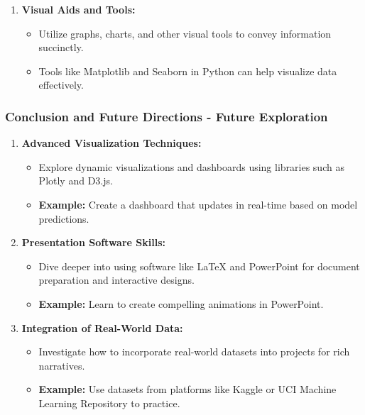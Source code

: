 \documentclass[aspectratio=169]{beamer}
\begin{document}
\begin{frame}[fragile]
\begin{enumerate}
        \item \textbf{Visual Aids and Tools:}
        \begin{itemize}
            \item Utilize graphs, charts, and other visual tools to convey information succinctly.
            \item Tools like Matplotlib and Seaborn in Python can help visualize data effectively.
        \end{itemize}
    \end{enumerate}  

\end{frame}

\begin{frame}[fragile]
    \frametitle{Conclusion and Future Directions - Future Exploration}
    
    \begin{enumerate}
        \item \textbf{Advanced Visualization Techniques:}
        \begin{itemize}
            \item Explore dynamic visualizations and dashboards using libraries such as Plotly and D3.js.
            \item \textbf{Example:} Create a dashboard that updates in real-time based on model predictions.
        \end{itemize}
        
        \item \textbf{Presentation Software Skills:}
        \begin{itemize}
            \item Dive deeper into using software like LaTeX and PowerPoint for document preparation and interactive designs.
            \item \textbf{Example:} Learn to create compelling animations in PowerPoint.
        \end{itemize}
        
        \item \textbf{Integration of Real-World Data:}
        \begin{itemize}
            \item Investigate how to incorporate real-world datasets into projects for rich narratives.
            \item \textbf{Example:} Use datasets from platforms like Kaggle or UCI Machine Learning Repository to practice.
        \end{itemize}
    \end{enumerate}

\end{frame}
\end{document}
